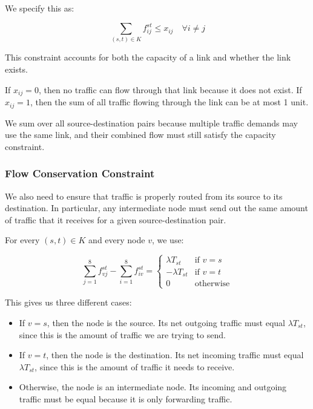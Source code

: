 \documentclass[11pt]{article}
\theoremstyle{definition}
\begin{document}
We specify this as:

\[
\sum_{(s,t)\in K} f_{ij}^{st} \leq x_{ij}
\quad \forall i \neq j
\]

This constraint accounts for both the capacity of a link and whether the link exists.

If $x_{ij} = 0$, then no traffic can flow through that link because it does not exist. If $x_{ij} = 1$, then the sum of all traffic flowing through the link can be at most 1 unit.

We sum over all source-destination pairs because multiple traffic demands may use the same link, and their combined flow must still satisfy the capacity constraint.

\subsubsection{Flow Conservation Constraint}

We also need to ensure that traffic is properly routed from its source to its destination. In particular, any intermediate node must send out the same amount of traffic that it receives for a given source-destination pair.

For every $(s,t) \in K$ and every node $v$, we use:

\[
\sum_{j=1}^{8} f_{vj}^{st}
-
\sum_{i=1}^{8} f_{iv}^{st}
=
\begin{cases}
\lambda T_{st} & \text{if } v=s \\
-\lambda T_{st} & \text{if } v=t \\
0 & \text{otherwise}
\end{cases}
\]

This gives us three different cases:

\begin{itemize}
    \item If $v=s$, then the node is the source. Its net outgoing traffic must equal $\lambda T_{st}$, since this is the amount of traffic we are trying to send.

    \item If $v=t$, then the node is the destination. Its net incoming traffic must equal $\lambda T_{st}$, since this is the amount of traffic it needs to receive.

    \item Otherwise, the node is an intermediate node. Its incoming and outgoing traffic must be equal because it is only forwarding traffic.
\end{itemize}
\end{document}
